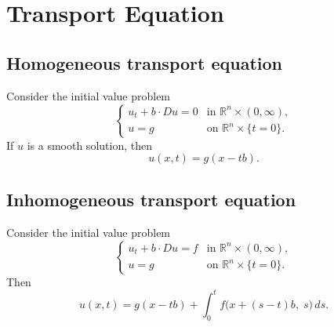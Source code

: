 \chapter{Transport Equation}

\section{Homogeneous transport equation}

\begin{theorem}
Consider the initial value problem
$$
\begin{cases}
u_t + b \cdot Du = 0 & \text{in } \mathbb{R}^n \times (0,\infty), \\
u = g & \text{on } \mathbb{R}^n \times \{t=0\}.
\end{cases}
$$
If $u$ is a smooth solution, then
$$
u(x,t) = g(x-tb).
$$
\end{theorem}

\section{Inhomogeneous transport equation}

\begin{theorem}
Consider the initial value problem
$$
\begin{cases}
u_t + b \cdot Du = f & \text{in } \mathbb{R}^n \times (0,\infty), \\
u = g & \text{on } \mathbb{R}^n \times \{t=0\}.
\end{cases}
$$
Then
$$
u(x,t) = g(x-tb) + \int_0^t f\bigl(x+(s-t)b,\; s\bigr)\,ds.
$$
\end{theorem}